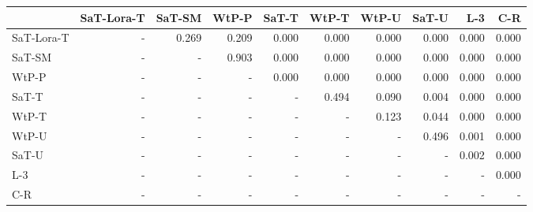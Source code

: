 \begin{tabular}{lrrrrrrrrr}
\toprule
 & SaT-Lora-T & SaT-SM & WtP-P & SaT-T & WtP-T & WtP-U & SaT-U & L-3 & C-R \\
\midrule
SaT-Lora-T & - & 0.269 & 0.209 & 0.000 & 0.000 & 0.000 & 0.000 & 0.000 & 0.000 \\
SaT-SM & - & - & 0.903 & 0.000 & 0.000 & 0.000 & 0.000 & 0.000 & 0.000 \\
WtP-P & - & - & - & 0.000 & 0.000 & 0.000 & 0.000 & 0.000 & 0.000 \\
SaT-T & - & - & - & - & 0.494 & 0.090 & 0.004 & 0.000 & 0.000 \\
WtP-T & - & - & - & - & - & 0.123 & 0.044 & 0.000 & 0.000 \\
WtP-U & - & - & - & - & - & - & 0.496 & 0.001 & 0.000 \\
SaT-U & - & - & - & - & - & - & - & 0.002 & 0.000 \\
L-3 & - & - & - & - & - & - & - & - & 0.000 \\
C-R & - & - & - & - & - & - & - & - & - \\
\bottomrule
\end{tabular}

